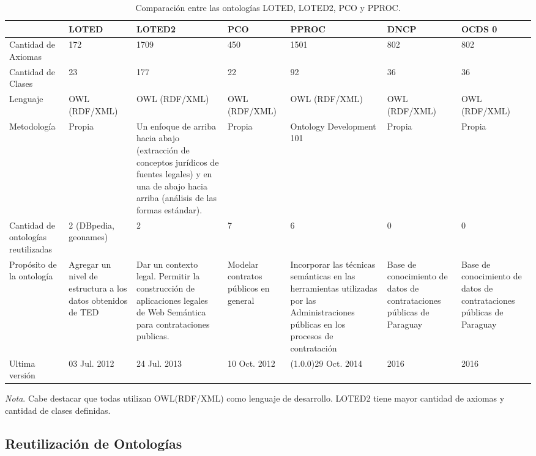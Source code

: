 \begin{table}[!htb]
    \caption{Comparación entre las ontologías LOTED, LOTED2, PCO y PPROC.}
    \label{tab:comparacion_ontologias}
    
    \scriptsize 
    \begin{tabular}{|L{2cm}|C{2.5cm}|C{2.5cm}|C{2cm}|C{2.5cm}|C{2cm}|}
    \hline
     & LOTED & LOTED2 & PCO & PPROC & DNCP  & OCDS 0 \\
    \hline

    
    Cantidad de Axiomas & 172 & 1709 & 450 & 1501 & 802 & 802\\
    \hline

    Cantidad de Clases & 23 & 177 & 22 & 92 & 36 & 36\\
    \hline

    Lenguaje & OWL (RDF/XML) & OWL (RDF/XML) & OWL (RDF/XML) & OWL (RDF/XML) & OWL (RDF/XML)& OWL (RDF/XML)\\
    \hline
    Metodología & Propia & 
    Un enfoque de arriba hacia abajo (extracción de conceptos jurídicos de fuentes legales) y en una de abajo hacia arriba (análisis de las formas estándar).
     & Propia & Ontology Development 101 & Propia & Propia\\
     \hline
    Cantidad de ontologías reutilizadas & 2 (DBpedia, geonames) & 2 & 7 & 6 & 0  & 0\\
    \hline
    Propósito de la ontología & Agregar un nivel de estructura a los datos obtenidos de TED & Dar un contexto legal. Permitir la construcción de aplicaciones legales de Web Semántica para contrataciones publicas. & Modelar contratos públicos en general & Incorporar las técnicas
    semánticas en las herramientas utilizadas por las Administraciones públicas en los procesos de contratación & Base de conocimiento de datos de contrataciones públicas de Paraguay & Base de conocimiento de datos de contrataciones públicas de Paraguay \\
    \hline
    Ultima versión & 03 Jul. 2012 & 24 Jul. 2013 & 10 Oct. 2012 & (1.0.0)29 Oct. 2014 & 2016 & 2016\\
    \hline
    \end{tabular}
    
    \bigskip
    \small\textit{Nota}. Cabe destacar que todas utilizan OWL(RDF/XML) como lenguaje de desarrollo. LOTED2 tiene mayor cantidad de axiomas y cantidad de clases definidas.
    \end{table}

    \subsection{Reutilización de Ontologías}


